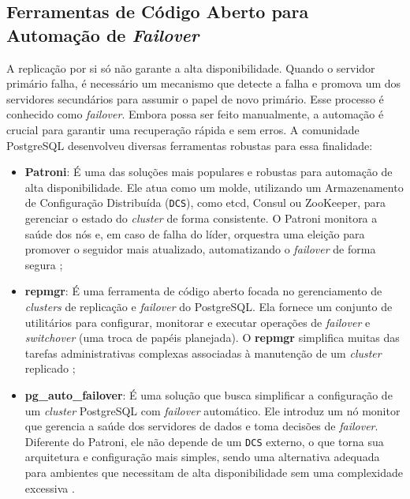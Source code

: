     \subsection{Ferramentas de Código Aberto para Automação de \textit{Failover}}

        A replicação por si só não garante a alta disponibilidade. Quando o servidor primário falha, é necessário um mecanismo que detecte a falha e promova um dos servidores secundários para assumir o papel de novo primário. Esse processo é conhecido como \textit{failover}. Embora possa ser feito manualmente, a automação é crucial para garantir uma recuperação rápida e sem erros. A comunidade PostgreSQL desenvolveu diversas ferramentas robustas para essa finalidade:
        
        \begin{itemize}
            \item \textbf{Patroni}: É uma das soluções mais populares e robustas para automação de alta disponibilidade. Ele atua como um molde, utilizando um Armazenamento de Configuração Distribuída (\verb|DCS|), como etcd, Consul ou ZooKeeper, para gerenciar o estado do \textit{cluster} de forma consistente. O Patroni monitora a saúde dos nós e, em caso de falha do líder, orquestra uma eleição para promover o seguidor mais atualizado, automatizando o \textit{failover} de forma segura \cite{patroni_official};
            
            \item \textbf{repmgr}: É uma ferramenta de código aberto focada no gerenciamento de \textit{clusters} de replicação e \textit{failover} do PostgreSQL. Ela fornece um conjunto de utilitários para configurar, monitorar e executar operações de \textit{failover} e \textit{switchover} (uma troca de papéis planejada). O \textbf{repmgr} simplifica muitas das tarefas administrativas complexas associadas à manutenção de um \textit{cluster} replicado \cite{repmgr_official};
            
            \item \textbf{pg\_auto\_failover}: É uma solução que busca simplificar a configuração de um \textit{cluster} PostgreSQL com \textit{failover} automático. Ele introduz um nó monitor que gerencia a saúde dos servidores de dados e toma decisões de \textit{failover}. Diferente do Patroni, ele não depende de um \verb|DCS| externo, o que torna sua arquitetura e configuração mais simples, sendo uma alternativa adequada para ambientes que necessitam de alta disponibilidade sem uma complexidade excessiva \cite{pg_auto_failover_official}.
        \end{itemize}

